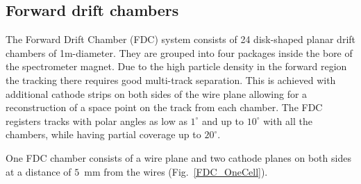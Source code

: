 \subsection[Forward drift chambers (Lubomir)]{Forward drift chambers
\label{sec:fdc} }

The Forward Drift Chamber (FDC) system consists of 24 disk-shaped planar drift chambers of 1m-diameter.
They are grouped into four packages inside the bore of the spectrometer magnet.
Due to the high particle density in the forward region the tracking there requires
good multi-track separation.
This is achieved with additional cathode strips on both sides of the wire plane allowing for a  reconstruction of a space point on the track from each chamber. 
The FDC registers tracks with polar angles as low as $1^\circ$ and up to $10^\circ $
with all the chambers, while having partial coverage up to $20^\circ$.

One FDC chamber consists of a wire plane and two cathode planes on both sides at a distance of $5$~mm from the wires (Fig.~\ref{FDC_OneCell}).


